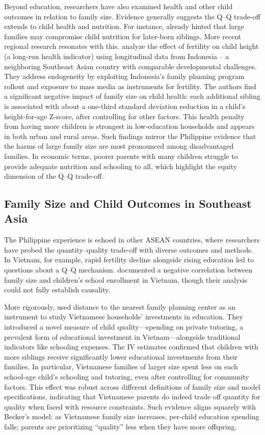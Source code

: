 \documentclass[]{AEA}
\begin{document}
Beyond education, researchers have also examined health and other child
outcomes in relation to family size. Evidence generally suggests the
Q--Q trade-off extends to child health and nutrition. For instance,
\citet{horton1986child} already hinted that large families may
compromise child nutrition for later-born siblings. More recent regional
research resonates with this. \citet{hatton2018fertility} analyze the
effect of fertility on child height (a long-run health indicator) using
longitudinal data from Indonesia -- a neighboring Southeast Asian
country with comparable developmental challenges. They address
endogeneity by exploiting Indonesia's family planning program rollout
and exposure to mass media as instruments for fertility. The authors
find a significant negative impact of family size on child health: each
additional sibling is associated with about a one-third standard
deviation reduction in a child's height-for-age Z-score, after
controlling for other factors. This health penalty from having more
children is strongest in low-education households and appears in both
urban and rural areas. Such findings mirror the Philippine evidence that
the harms of large family size are most pronounced among disadvantaged
families. In economic terms, poorer parents with many children struggle
to provide adequate nutrition and schooling to all, which highlight the
equity dimension of the Q--Q trade-off.

\subsection{Family Size and Child Outcomes in Southeast Asia}

The Philippine experience is echoed in other ASEAN countries, where
researchers have probed the quantity--quality trade-off with diverse
outcomes and methods. In Vietnam, for example, rapid fertility decline
alongside rising education led to questions about a Q--Q mechanism.
\citet{anh1998family} documented a negative correlation between family
size and children's school enrollment in Vietnam, though their analysis
could not fully establish causality.

More rigorously, \citet{dang2016decision} used distance to the nearest
family planning center as an instrument to study Vietnamese households'
investments in education. They introduced a novel measure of child
quality---spending on private tutoring, a prevalent form of educational
investment in Vietnam---alongside traditional indicators like schooling
expenses. The IV estimates confirmed that children with more siblings
receive significantly lower educational investments from their families.
In particular, Vietnamese families of larger size spent less on each
school-age child's schooling and tutoring, even after controlling for
community factors. This effect was robust across different definitions
of family size and model specifications, indicating that Vietnamese
parents do indeed trade off quantity for quality when faced with
resource constraints. Such evidence aligns squarely with Becker's model:
as Vietnamese family size increases, per-child education spending falls;
parents are prioritizing ``quality'' less when they have more offspring.
\end{document}
